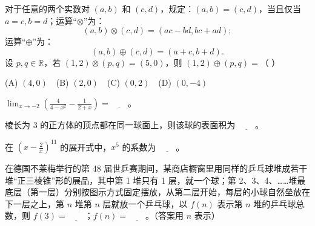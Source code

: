 \begin{question}
对于任意的两个实数对 \((a,b)\) 和 \((c,d)\)，规定：\((a,b)=(c,d)\)，当且仅当 \(a=c,b=d\)；运算“\(\otimes\)”为：
\nopagebreak[4]
\[
(a,b)\otimes(c,d)=(ac-bd,bc+ad);
\]
运算“\(\oplus\)”为：
\nopagebreak[4]
\[
(a,b)\oplus(c,d)=(a+c,b+d).
\]
设 \(p,q\in\mathbb R\)，若 \((1,2)\otimes(p,q)=(5,0)\)，则 \((1,2)\oplus(p,q)=\)（  ）

(A) \((4,0)\)　(B) \((2,0)\)　(C) \((0,2)\)　(D) \((0,-4)\)

\end{question}

\begin{question}
\(\displaystyle\lim_{x\to-2}\left(\frac{4}{4-x^2}-\frac{1}{2+x}\right)=\underline{\qquad}\)。

\end{question}
\begin{question}
棱长为 3 的正方体的顶点都在同一球面上，则该球的表面积为 \(\underline{\qquad}\)。

\end{question}
\begin{question}
在 \(\left(x-\frac2x\right)^{11}\) 的展开式中，\(x^5\) 的系数为 \(\underline{\qquad}\)。

\Needspace{0.4\textheight}
\end{question}
\begin{question}
在德国不莱梅举行的第 48 届世乒赛期间，某商店橱窗里用同样的乒乓球堆成若干堆“正三棱锥”形的展品，其中第 1 堆只有 1 层，就一个球；第 2、3、4、……堆最底层（第一层）分别按图示方式固定摆放，从第二层开始，每层的小球自然垒放在下一层之上，第 \(n\) 堆第 \(n\) 层就放一个乒乓球，以 \(f(n)\) 表示第 \(n\) 堆的乒乓球总数，则 \(f(3)=\underline{\qquad}\)；\(f(n)=\underline{\qquad}\)。（答案用 \(n\) 表示）
\nopagebreak[4]
\begin{center}\end{center}
\nopagebreak[4]
\end{question}

